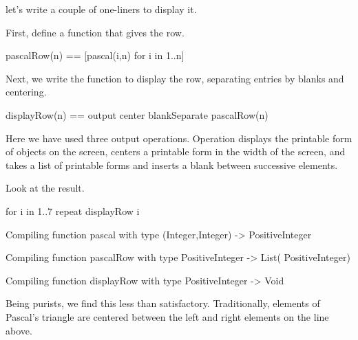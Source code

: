 let's write a couple of one-liners to display it.
\begin{xtc}
\begin{xtccomment}
First, define a function that gives the  row.
\end{xtccomment}
\begin{spadsrc}
pascalRow(n) == [pascal(i,n) for i in 1..n] 
\end{spadsrc}
\end{xtc}
\begin{xtc}
\begin{xtccomment}
Next, we write the function 
to display the row, separating entries by blanks and centering.
\end{xtccomment}
\begin{spadsrc}
displayRow(n) == output center blankSeparate pascalRow(n) 
\end{spadsrc}
\end{xtc}
%
Here we have used three output operations.
Operation 
displays the printable form of objects on the screen,
 centers a printable form in the
width of the screen, and  takes a list of
printable forms and inserts a blank between successive elements.
\begin{xtc}
\begin{xtccomment}
Look at the result.
\end{xtccomment}
\begin{spadsrc}
for i in 1..7 repeat displayRow i 
\end{spadsrc}
\begin{MessageOutput}
   Compiling function pascal with type (Integer,Integer) -> 
      PositiveInteger 
\end{MessageOutput}
\begin{MessageOutput}
   Compiling function pascalRow with type PositiveInteger -> List(
      PositiveInteger) 
\end{MessageOutput}
\begin{MessageOutput}
   Compiling function displayRow with type PositiveInteger -> Void 
\end{MessageOutput}
\end{xtc}
Being purists, we find this less than satisfactory.
Traditionally, elements of Pascal's triangle are centered between
the left and right elements on the line above.
%
